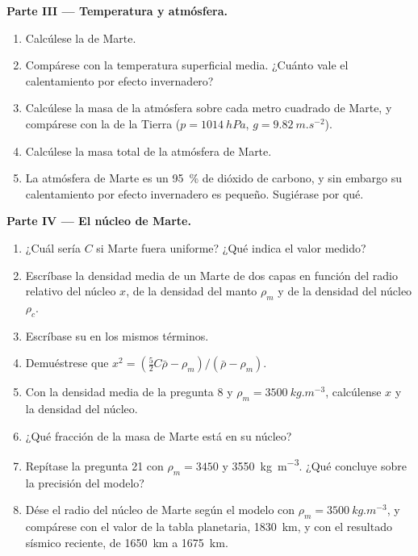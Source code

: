 \begin{problem}
\medskip
\noindent\textbf{Parte III --- Temperatura y atmósfera.}
\begin{enumerate}[resume]
  \item Calcúlese la  de Marte.
  \item Compárese con la temperatura superficial media. ¿Cuánto vale el calentamiento por efecto
        invernadero?
  \item Calcúlese la masa de la atmósfera sobre cada metro cuadrado de Marte, y compárese con la de
        la Tierra ($p = \qty{1014}{hPa}$, $g = \qty{9.82}{m.s^{-2}}$).
  \item Calcúlese la masa total de la atmósfera de Marte.
  \item La atmósfera de Marte es un \qty{95}{\percent} de dióxido de carbono, y sin embargo su
        calentamiento por efecto invernadero es pequeño. Sugiérase por qué.
\end{enumerate}

\medskip
\noindent\textbf{Parte IV --- El núcleo de Marte.}
\begin{enumerate}[resume]
  \item ¿Cuál sería $C$ si Marte fuera uniforme? ¿Qué indica el valor medido?
  \item Escríbase la densidad media de un Marte de dos capas en función del radio relativo del
        núcleo $x$, de la densidad del manto $\rho_m$ y de la densidad del núcleo $\rho_c$.
  \item Escríbase su  en los mismos términos.
  \item Demuéstrese que $x^2 = (\tfrac52C\bar\rho - \rho_m)/(\bar\rho - \rho_m)$.
  \item Con la densidad media de la pregunta 8 y $\rho_m =
        \qty{3500}{kg.m^{-3}}$, calcúlense $x$ y la densidad del núcleo.
  \item ¿Qué fracción de la masa de Marte está en su núcleo?
  \item Repítase la pregunta 21 con $\rho_m = 3450$ y \qty{3550}{kg.m^{-3}}. ¿Qué concluye
        sobre la precisión del modelo?
  \item Dése el radio del núcleo de Marte según el modelo con $\rho_m = \qty{3500}{kg.m^{-3}}$, y
        compárese con el valor de la tabla planetaria, \qty{1830}{km}, y con el resultado sísmico
        reciente, de \qty{1650}{km} a \qty{1675}{km}.
\end{enumerate}
\end{problem}
